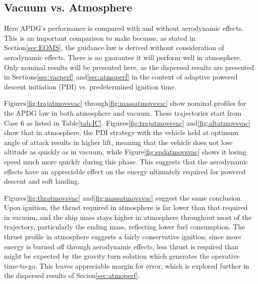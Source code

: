 \subsection{Vacuum vs. Atmosphere} \label{sec:atmovsvac}
Here APDG's performance is compared with and without aerodynamic effects. This is an important comparison to make because, as stated in Section\:\ref{sec:EOMS}, the guidance law is derived without consideration of aerodynamic effects. There is no guarantee it will perform well in atmosphere. Only nominal results will be presented here, as the dispersed results are presented in Sections\:\ref{sec:vacperf} and\:\ref{sec:atmoperf} in the context of adaptive powered descent initiation (PDI) vs. predetermined ignition time.

Figures\:\ref{fig:trajatmovsvac} through\:\ref{fig:massatmovsvac} show nominal profiles for the APDG law in both atmosphere and vacuum. These trajectories start from Case 6 as listed in Table\:\ref{tab:IC}. Figures\:\ref{fig:trajatmovsvac} and\:\ref{fig:altatmovsvac} show that in atmosphere, the PDI strategy with the vehicle held at optimum angle of attack results in higher lift, meaning that the vehicle does not lose altitude as quickly as in vacuum, while Figure\:\ref{fig:spdatmovsvac} shows it losing speed much more quickly during this phase. This suggests that the aerodynamic effects have an appreciable effect on the energy ultimately required for powered descent and soft landing. 

Figures\:\ref{fig:thratmovsvac} and\:\ref{fig:massatmovsvac} suggest the same conclusion. Upon ignition, the thrust required in atmosphere is far lower than that required in vacuum, and the ship mass stays higher in atmosphere throughout most of the trajectory, particularly the ending mass, reflecting lower fuel consumption. The thrust profile in atmosphere suggests a fairly conservative ignition; since more energy is burned off through aerodynamic effects, less thrust is required than might be expected by the gravity turn solution which generates the operative time-to-go. This leaves appreciable margin for error, which is explored further in the dispersed results of Secion\:\ref{sec:atmoperf}.


